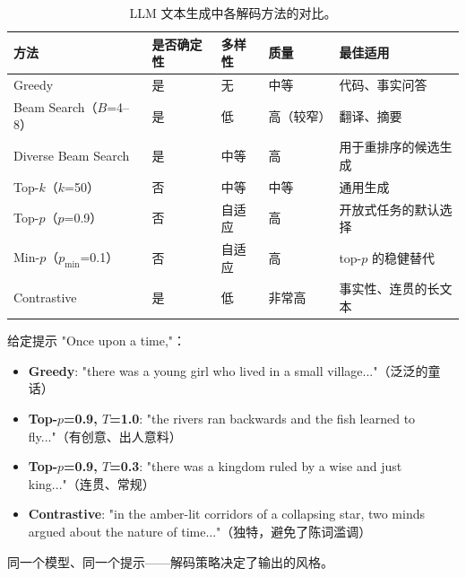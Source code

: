 \begin{table}[ht!]
\centering\small
\caption{LLM 文本生成中各解码方法的对比。}
\begin{tabularx}{0.88\linewidth}{@{}l Z{0.64} Z{0.64} Z{0.64} Z{2.08}@{}}
\toprule
\textbf{方法} & \textbf{是否确定性} & \textbf{多样性} & \textbf{质量} & \textbf{最佳适用} \\
\midrule
Greedy & 是 & 无 & 中等 & 代码、事实问答 \\
Beam Search（$B$=4--8） & 是 & 低 & 高（较窄） & 翻译、摘要 \\
Diverse Beam Search & 是 & 中等 & 高 & 用于重排序的候选生成 \\
Top-$k$（$k$=50） & 否 & 中等 & 中等 & 通用生成 \\
Top-$p$（$p$=0.9） & 否 & 自适应 & 高 & 开放式任务的默认选择 \\
Min-$p$（$p_{\min}$=0.1） & 否 & 自适应 & 高 & top-$p$ 的稳健替代 \\
Contrastive & 是 & 低 & 非常高 & 事实性、连贯的长文本 \\
\bottomrule
\end{tabularx}
\end{table}

\begin{examplebox}
给定提示 "Once upon a time,"：

\begin{itemize}
  \item \textbf{Greedy}: "there was a young girl who lived in a small village..."（泛泛的童话）
  \item \textbf{Top-$p$=0.9, $T$=1.0}: "the rivers ran backwards and the fish learned to fly..."（有创意、出人意料）
  \item \textbf{Top-$p$=0.9, $T$=0.3}: "there was a kingdom ruled by a wise and just king..."（连贯、常规）
  \item \textbf{Contrastive}: "in the amber-lit corridors of a collapsing star, two minds argued about the nature of time..."（独特，避免了陈词滥调）
\end{itemize}

同一个模型、同一个提示——解码策略决定了输出的风格。
\end{examplebox}

